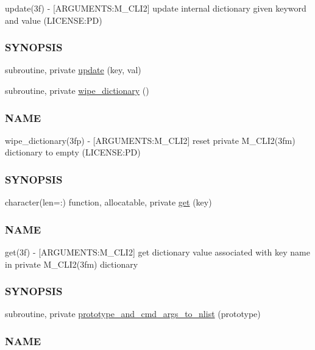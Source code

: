 \begin{DoxyCompactItemize}
\begin{DoxyCompactList}
update(3f) -\/ \mbox{[}A\+R\+G\+U\+M\+E\+N\+TS\+:M\+\_\+\+C\+L\+I2\mbox{]} update internal dictionary given keyword and value (L\+I\+C\+E\+N\+SE\+:PD) \subsubsection*{S\+Y\+N\+O\+P\+S\+IS}\end{DoxyCompactList}\item 
subroutine, private \mbox{\hyperlink{namespacem__cli2_a160d56bc4a10faef7e8a8a4f04f4dadb}{update}} (key, val)
\item 
subroutine, private \mbox{\hyperlink{namespacem__cli2_ab1525b0419475486f520ef502daa5e94}{wipe\+\_\+dictionary}} ()
\begin{DoxyCompactList}\small\item\em \subsubsection*{N\+A\+ME}

wipe\+\_\+dictionary(3fp) -\/ \mbox{[}A\+R\+G\+U\+M\+E\+N\+TS\+:M\+\_\+\+C\+L\+I2\mbox{]} reset private M\+\_\+\+C\+L\+I2(3fm) dictionary to empty (L\+I\+C\+E\+N\+SE\+:PD) \subsubsection*{S\+Y\+N\+O\+P\+S\+IS}\end{DoxyCompactList}\item 
character(len=\+:) function, allocatable, private \mbox{\hyperlink{namespacem__cli2_aa92e8ad0300d4e324e29eae1ab9d04b4}{get}} (key)
\begin{DoxyCompactList}\small\item\em \subsubsection*{N\+A\+ME}

get(3f) -\/ \mbox{[}A\+R\+G\+U\+M\+E\+N\+TS\+:M\+\_\+\+C\+L\+I2\mbox{]} get dictionary value associated with key name in private M\+\_\+\+C\+L\+I2(3fm) dictionary \subsubsection*{S\+Y\+N\+O\+P\+S\+IS}\end{DoxyCompactList}\item 
subroutine, private \mbox{\hyperlink{namespacem__cli2_a30083aabd53a9db9794ecbd23c2226d0}{prototype\+\_\+and\+\_\+cmd\+\_\+args\+\_\+to\+\_\+nlist}} (prototype)
\begin{DoxyCompactList}\small\item\em \subsubsection*{N\+A\+ME}


\end{DoxyCompactList}
\end{DoxyCompactItemize}
